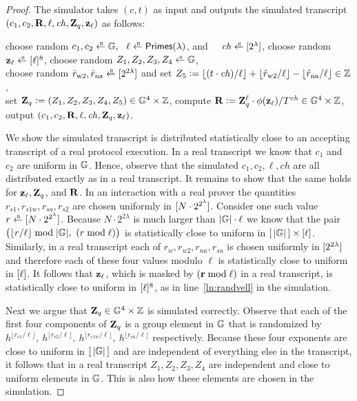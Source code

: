 \documentclass[11pt]{article}
\begin{document}
\begin{proof}
The simulator takes $(c, t)$ as input and outputs the simulated transcript
$(c_1, c_2, \mathbf{R}, \ell, \mathit{ch}, \mathbf{Z}_q, \mathbf{z}_\ell)$ as follows:
\begin{alg}
\> choose random $c_1, c_2 \rgets \GG,\ \ \ell \rgets \primes$, and
\ \ $\mathit{ch} \rgets \range{2^\lambda}$, \AlgSep
\lnum \label{ln:randvell}
\> choose random $\zv_\ell \rgets \range{\ell}^8$, \AlgSep
\> choose random $Z_1, Z_2, Z_3, Z_4 \rgets \GG$, \\
\lnum \label{ln:sim}
\> choose random $\hat{r}_\text{w2}, \hat{r}_\text{na} \rgets \range{2^{2\lambda}}$
and set $Z_5 \mathrel{\mathop:}= \lfloor (t \cdot \mathit{ch})/\ell \rfloor + \lfloor \hat{r}_\text{w2} / \ell \rfloor - \lfloor \hat{r}_\text{na} / \ell \rfloor \in \mathbb Z$, \\
\> set $\mathbf{Z}_q \mathrel{\mathop:}= (Z_1, Z_2, Z_3, Z_4, Z_5)  \in \mathbb G^4 \times \mathbb Z$, \AlgSep
\lnum \label{ln:computeR}
\> compute $\mathbf{R} \mathrel{\mathop:}= \mathbf{Z}_q^\ell \cdot \phi(\mathbf{z}_\ell) / T^\mathit{ch} \in \mathbb G^4 \times \mathbb Z$, \AlgSep
\> output $(c_1, c_2, \mathbf{R}, \ell, \mathit{ch}, \mathbf{Z}_q, \mathbf{z}_\ell)$.
\end{alg}
We show the simulated transcript is distributed statistically close
to an accepting transcript of a real protocol execution.
In a real transcript we know that $c_1$ and $c_2$ are uniform in $\mathbb G$. 
Hence, observe that the simulated $c_1, c_2, \ell, \mathit{ch}$ are all distributed 
exactly as in a real transcript.  It remains to show that the same holds
for $\mathbf{z}_\ell, \mathbf{Z}_q$, and $\mathbf{R}$. 
In an interaction with a real prover the quantities
$r_\mathit{s1}, r_\mathit{s1w}, r_\mathit{sa}, r_\mathit{s2}$
are chosen uniformly in $[{N \cdot 2^{2^\lambda}}]$.
Consider one such value $r \rgets \range{N \cdot 2^{2^\lambda}}$.
Because $N \cdot 2^{2\lambda}$ is much larger than $\lvert \mathbb G \rvert \cdot \ell$
we know that the pair
$\big(\lfloor r/\ell \rfloor \bmod \lvert \mathbb G \rvert,\ (r \bmod \ell) \big)$
is statistically close to uniform in $[{\,\lvert \mathbb G \rvert\,}] \times [{\ell}]$.
Similarly,  in a real transcript
each of $r_w, r_\mathit{w2}, r_\mathit{na}, r_\mathit{sa}$
is chosen uniformly in $[{2^{2 \lambda}}]$ and therefore
each of these four values modulo $\ell$
is statistically close to uniform in $[{\ell}]$.
It follows that $\mathbf{z}_\ell$, which is masked by $(\mathbf{r} \bmod \ell)$
in a real transcript, is statistically close to uniform 
in $[{\ell}]^8$, as in line~\eqref{ln:randvell} in the simulation.

Next we argue that $\mathbf{Z}_q \in \mathbb G^4 \times \mathbb Z$ is simulated correctly.
Observe that each of the first four components of $\mathbf{Z}_q$ is a group
element in $\mathbb G$ that is randomized by
$h^{\lfloor r_\mathit{s1} / \ell \rfloor},\
 h^{\lfloor r_\mathit{s2} / \ell \rfloor},\
 h^{\lfloor r_\mathit{s1w} / \ell \rfloor},\
 h^{\lfloor r_\mathit{sa} / \ell \rfloor}$ respectively.
Because these four exponents are close to uniform in $[{\,\lvert \mathbb G \rvert\,}]$ and are
independent of everything else in the transcript, it follows that
in a real transcript $Z_1, Z_2, Z_3, Z_4$ are independent and close to uniform elements in $\mathbb G$.  This is also how these elements are chosen in the simulation.


\end{proof}
\end{document}
